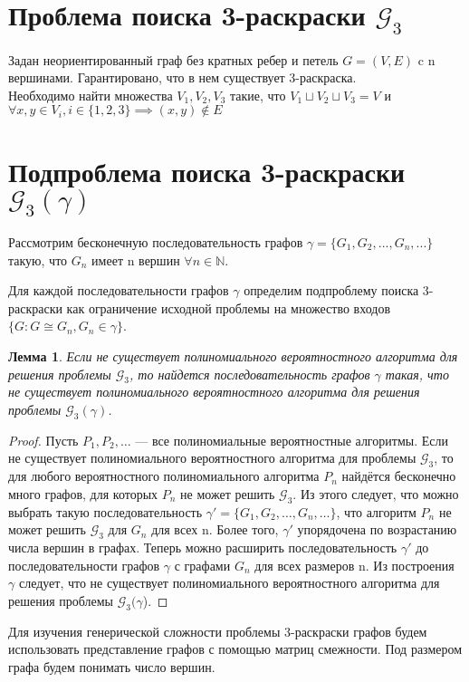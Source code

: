 \documentclass[a4paper, 12pt]{article}
\newtheorem{lemma}{Лемма}
\theoremstyle{definition}
\theoremstyle{remark}
\begin{document}
\section*{Проблема поиска 3-раскраски $\mathcal
G_3$}
Задан неориентированный граф без кратных ребер и петель $G = (V, E)$ c n вершинами. Гарантировано,
что в нем существует 3-раскраска.
\\
Необходимо найти
множества $V_1, V_2, V_3$ такие, что $V_1\sqcup V_2 \sqcup V_3 = V$ и
$\forall x, y\in V_i, i\in \{1, 2, 3\} \implies (x, y)\notin E$

\section*{Подпроблема поиска 3-раскраски $\mathcal
G_3(\gamma)$}
Рассмотрим бесконечную последовательность графов $\gamma = \{G_1, G_2, ..., G_n, ...\}$
такую, что $G_n$ имеет n вершин $\forall n\in \mathbb N$.

Для каждой последовательности графов $\gamma$ определим подпроблему поиска 3-раскраски
как ограничение исходной проблемы на множество входов $\{G: G\cong G_n, G_n \in \gamma\}$.

\begin{lemma}
	Если не существует полиномиального вероятностного алгоритма для
	решения проблемы $\mathcal
G_3$, то найдется последовательность графов $\gamma$ такая,
	что не существует полиномиального вероятностного алгоритма для решения
	проблемы $\mathcal
G_3(\gamma)$.
\end{lemma}

\begin{proof}
	Пусть $P_1, P_2, \dots$ — все полиномиальные вероятностные алгоритмы. Если не существует полиномиального вероятностного алгоритма для проблемы
	$\mathcal
 G_3$, то для любого вероятностного полиномиального алгоритма $P_n$ найдётся бесконечно много графов, для которых $P_n$ не может решить $\mathcal
 G_3$. Из этого следует, что
	можно выбрать такую последовательность $\gamma'
		= \{G_1, G_2, \dots , G_n, \dots\}$, что алгоритм $P_n$
	не может решить $\mathcal
 G_3$ для $G_n$ для всех n. Более того, $\gamma'$
	упорядочена по возрастанию
	числа вершин в графах. Теперь можно расширить последовательность $\gamma'$ до последовательности графов $\gamma$ с графами $G_n$ для всех размеров n. Из построения $\gamma$ следует,
	что не существует полиномиального вероятностного алгоритма для решения проблемы $\mathcal
 G_3(\gamma$).
\end{proof}

Для изучения генерической сложности проблемы 3-раскраски графов будем использовать представление графов с помощью матриц смежности. Под размером графа будем понимать число вершин.
\end{document}
